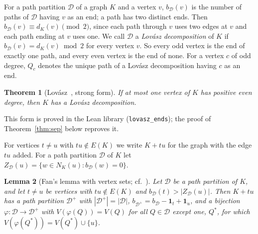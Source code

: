 \documentclass[11pt]{amsart}
\newtheorem{theorem}{Theorem}[section]
\newtheorem{lemma}[theorem]{Lemma}
\theoremstyle{definition}
\newcommand{\cD}{\mathcal D}
\begin{document}
For a path partition $\cD$ of a graph $K$ and a vertex $v$, $b_\cD(v)$ is the number of paths of $\cD$
having $v$ as an end; a path has two distinct ends. Then $b_\cD(v)\equiv d_K(v)\pmod 2$, since each path
through $v$ uses two edges at $v$ and each path ending at $v$ uses one. We call $\cD$ a \emph{Lov\'asz
decomposition} of $K$ if $b_\cD(v)=d_K(v)\bmod 2$ for every vertex $v$. So every odd vertex is the end of
exactly one path, and every even vertex is the end of none. For a vertex $c$ of odd degree, $Q_c$ denotes
the unique path of a Lov\'asz decomposition having $c$ as an end.

\begin{theorem}[Lov\'asz~\cite{L68}, strong form]\label{thm:lovasz}
If at most one vertex of $K$ has positive even degree, then $K$ has a Lov\'asz decomposition.
\end{theorem}

This form is proved in the Lean library (\texttt{lovasz\_ends}); the proof of
Theorem~\ref{thm:sep} below reproves it.

For vertices $t\neq u$ with $tu\notin E(K)$ we write $K+tu$ for the graph with the edge $tu$ added. For a
path partition $\cD$ of $K$ let $Z_\cD(u)=\{w\in N_K(u): b_\cD(w)=0\}$.

\begin{lemma}[Fan's lemma with vertex sets; cf.~{\cite[Lemma~3.4]{Fan05}}]\label{lem:fan}
Let $\cD$ be a path partition of $K$, and let $t\neq u$ be vertices with $tu\notin E(K)$ and
$b_\cD(t)>|Z_\cD(u)|$. Then $K+tu$ has a path partition $\cD^+$ with $|\cD^+|=|\cD|$,
$b_{\cD^+}=b_\cD-\mathbf 1_t+\mathbf 1_u$, and a bijection $\varphi:\cD\to\cD^+$ with $V(\varphi(Q))=V(Q)$
for all $Q\in\cD$ except one, $Q^\ast$, for which $V(\varphi(Q^\ast))=V(Q^\ast)\cup\{u\}$.
\end{lemma}
\end{document}

